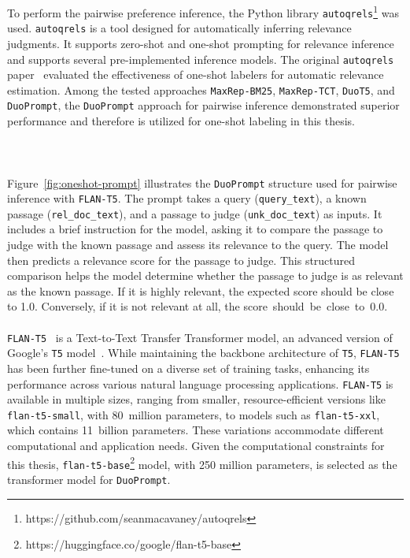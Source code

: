 \noindent To perform the pairwise preference inference, the Python library \texttt{autoqrels}\footnote{\scriptsize https://github.com/seanmacavaney/autoqrels} was used. \texttt{autoqrels} is a tool designed for automatically inferring relevance judgments. It supports zero-shot and one-shot prompting for relevance inference and supports several pre-implemented inference models. The original \texttt{autoqrels} paper~\cite{macavaney:2023} evaluated the effectiveness of one-shot labelers for automatic relevance estimation. Among the tested approaches \texttt{MaxRep-BM25}, \texttt{MaxRep-TCT}, \texttt{DuoT5}, and \texttt{DuoPrompt}, the \texttt{DuoPrompt} approach for pairwise \mbox{inference} demonstrated superior performance and therefore is utilized for \linebreak one-shot labeling in this thesis.
\\\\\\\\
Figure~\ref{fig:oneshot-prompt} illustrates the \texttt{DuoPrompt} structure used for pairwise inference with \texttt{FLAN-T5}. The prompt takes a query (\texttt{query\_text}), a known passage (\texttt{rel\_doc\_text}), and a passage to judge (\texttt{unk\_doc\_text}) as inputs. It includes a brief instruction for the model, asking it to compare the passage to judge with the known passage and assess its relevance to the query. The model then predicts a relevance score for the passage to judge. This structured comparison helps the model determine whether the passage to judge is as relevant as the known passage. If it is highly relevant, the expected score should be close to 1.0. Conversely, if it is not relevant at all, the \mbox{score should be close to 0.0}.
\\\\
\texttt{FLAN-T5}~\cite{chung:2022} is a Text-to-Text Transfer Transformer model, an advanced version of Google's \texttt{T5} model~\cite{raffel:2020}. While maintaining the backbone architecture of \texttt{T5}, \texttt{FLAN-T5} has been further fine-tuned on a diverse set of training tasks, enhancing its performance across various natural language processing applications. \texttt{FLAN-T5} is available in multiple sizes, ranging from smaller, resource-efficient versions like \texttt{flan-t5-small}, with 80~million parameters, to models such as \texttt{flan-t5-xxl}, which contains 11~billion parameters. These variations accommodate different computational and application needs. Given the computational constraints for this thesis, \texttt{flan-t5-base}\footnote{\scriptsize https://huggingface.co/google/flan-t5-base} model, with 250 \mbox{million} parameters, is selected as the transformer model for \texttt{DuoPrompt}.

